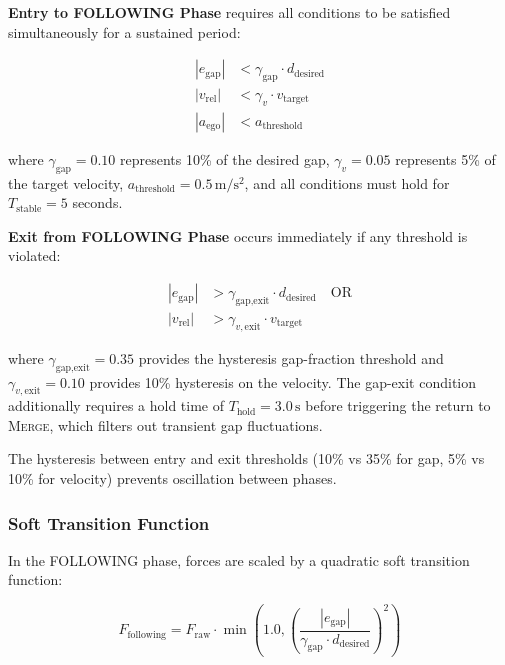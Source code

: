 \documentclass[12pt,a4paper,oneside]{report}
\begin{document}
\textbf{Entry to FOLLOWING Phase} requires all conditions to be satisfied simultaneously for a sustained period:

\begin{align}
|e_{\text{gap}}| &< \gamma_{\text{gap}} \cdot d_{\text{desired}} \label{eq:following_gap} \\
|v_{\text{rel}}| &< \gamma_v \cdot v_{\text{target}} \label{eq:following_vel} \\
|a_{\text{ego}}| &< a_{\text{threshold}} \label{eq:following_acc}
\end{align}

where $\gamma_{\text{gap}} = 0.10$ represents 10\% of the desired gap, $\gamma_v = 0.05$ represents 5\% of the target velocity, $a_{\text{threshold}} = 0.5\,\mathrm{m/s^{2}}$, and all conditions must hold for $T_{\text{stable}} = 5$ seconds.


\textbf{Exit from FOLLOWING Phase} occurs immediately if any threshold is violated:

\begin{align}
|e_{\text{gap}}| &> \gamma_{\text{gap,exit}} \cdot d_{\text{desired}} \quad \text{OR} \label{eq:merging_gap} \\
|v_{\text{rel}}| &> \gamma_{v,\text{exit}} \cdot v_{\text{target}} \label{eq:merging_vel}
\end{align}

where $\gamma_{\text{gap,exit}} = 0.35$ provides the hysteresis gap-fraction threshold and $\gamma_{v,\text{exit}} = 0.10$ provides 10\% hysteresis on the velocity. The gap-exit condition additionally requires a hold time of $T_{\mathrm{hold}} = 3.0\,\mathrm{s}$ before triggering the return to \textsc{Merge}, which filters out transient gap fluctuations.


The hysteresis between entry and exit thresholds (10\% vs 35\% for gap, 5\% vs 10\% for velocity) prevents oscillation between phases.

\subsubsection{Soft Transition Function}

In the FOLLOWING phase, forces are scaled by a quadratic soft transition function:

\begin{equation}
F_{\text{following}} = F_{\text{raw}} \cdot \min\left(1.0, \left(\frac{|e_{\text{gap}}|}{\gamma_{\text{gap}} \cdot d_{\text{desired}}}\right)^2\right)
\label{eq:soft_transition}
\end{equation}
\end{document}
